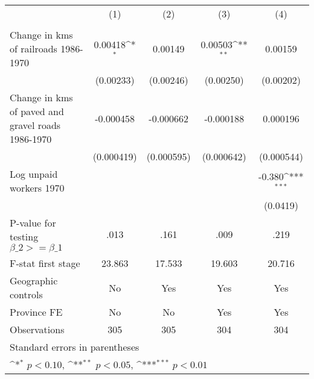 {
\def\sym#1{\ifmmode^{#1}\else\(^{#1}\)\fi}
\begin{tabular}{l*{4}{c}}
\hline\hline
                &\multicolumn{1}{c}{(1)}&\multicolumn{1}{c}{(2)}&\multicolumn{1}{c}{(3)}&\multicolumn{1}{c}{(4)}\\
                &\multicolumn{1}{c}{}&\multicolumn{1}{c}{}&\multicolumn{1}{c}{}&\multicolumn{1}{c}{}\\
\hline
Change in kms of railroads 1986-1970&  0.00418\sym{*}  &  0.00149         &  0.00503\sym{**} &  0.00159         \\
                &(0.00233)         &(0.00246)         &(0.00250)         &(0.00202)         \\
[1em]
Change in kms of paved and gravel roads 1986-1970&-0.000458         &-0.000662         &-0.000188         & 0.000196         \\
                &(0.000419)         &(0.000595)         &(0.000642)         &(0.000544)         \\
[1em]
Log unpaid workers 1970&                  &                  &                  &   -0.380\sym{***}\\
                &                  &                  &                  & (0.0419)         \\
\hline
P-value for testing $\beta\_{2} >= \beta\_{1}$&     .013         &     .161         &     .009         &     .219         \\
F-stat first stage&   23.863         &   17.533         &   19.603         &   20.716         \\
Geographic controls&       No         &      Yes         &      Yes         &      Yes         \\
Province FE     &       No         &       No         &      Yes         &      Yes         \\
Observations    &      305         &      305         &      304         &      304         \\
\hline\hline
\multicolumn{5}{l}{\footnotesize Standard errors in parentheses}\\
\multicolumn{5}{l}{\footnotesize \sym{*} \(p<0.10\), \sym{**} \(p<0.05\), \sym{***} \(p<0.01\)}\\
\end{tabular}
}

